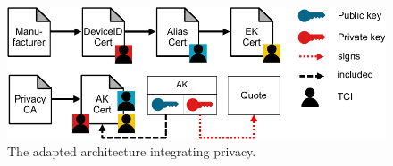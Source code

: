 \begin{figure}[htb]
  \centering
  \includegraphics[width=1\linewidth]{figures/privacy-arch.pdf}
  \caption{The adapted architecture integrating privacy.} \label{fig:privacy_arch}
\end{figure}
